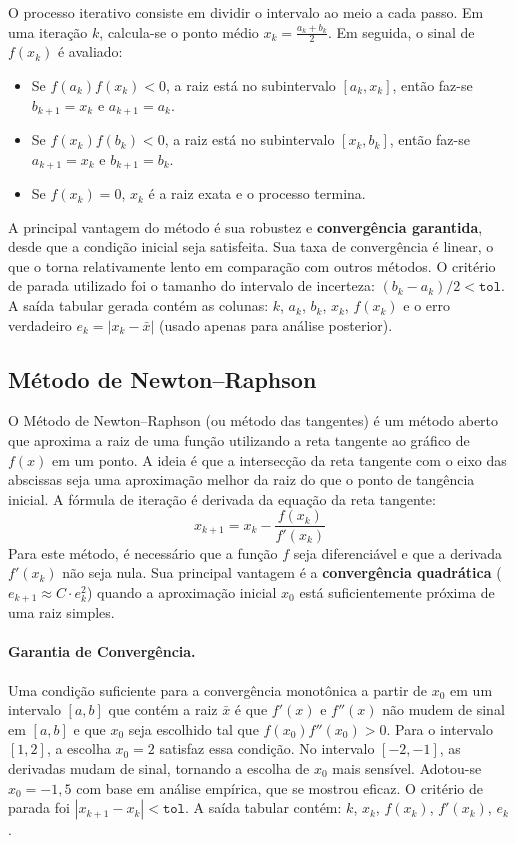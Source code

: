\documentclass[12pt,a4paper]{article}
\begin{document}
O processo iterativo consiste em dividir o intervalo ao meio a cada passo. Em uma iteração $k$, calcula-se o ponto médio $x_k = \frac{a_k+b_k}{2}$. Em seguida, o sinal de $f(x_k)$ é avaliado:
\begin{itemize}
    \item Se $f(a_k)f(x_k) < 0$, a raiz está no subintervalo $[a_k, x_k]$, então faz-se $b_{k+1}=x_k$ e $a_{k+1}=a_k$.
    \item Se $f(x_k)f(b_k) < 0$, a raiz está no subintervalo $[x_k, b_k]$, então faz-se $a_{k+1}=x_k$ e $b_{k+1}=b_k$.
    \item Se $f(x_k) = 0$, $x_k$ é a raiz exata e o processo termina.
\end{itemize}
A principal vantagem do método é sua robustez e \textbf{convergência garantida}, desde que a condição inicial seja satisfeita. Sua taxa de convergência é linear, o que o torna relativamente lento em comparação com outros métodos. O critério de parada utilizado foi o tamanho do intervalo de incerteza: $(b_k-a_k)/2 < \texttt{tol}$. A saída tabular gerada contém as colunas: $k$, $a_k$, $b_k$, $x_k$, $f(x_k)$ e o erro verdadeiro $e_k=|x_k-\bar{x}|$ (usado apenas para análise posterior).

\subsection{Método de Newton--Raphson}
O Método de Newton--Raphson (ou método das tangentes) é um método aberto que aproxima a raiz de uma função utilizando a reta tangente ao gráfico de $f(x)$ em um ponto. A ideia é que a intersecção da reta tangente com o eixo das abscissas seja uma aproximação melhor da raiz do que o ponto de tangência inicial. A fórmula de iteração é derivada da equação da reta tangente:
\[
x_{k+1} = x_k - \frac{f(x_k)}{f'(x_k)}
\]
Para este método, é necessário que a função $f$ seja diferenciável e que a derivada $f'(x_k)$ não seja nula. Sua principal vantagem é a \textbf{convergência quadrática} ($e_{k+1} \approx C \cdot e_k^2$) quando a aproximação inicial $x_0$ está suficientemente próxima de uma raiz simples.

\paragraph{Garantia de Convergência.} Uma condição suficiente para a convergência monotônica a partir de $x_0$ em um intervalo $[a,b]$ que contém a raiz $\bar{x}$ é que $f'(x)$ e $f''(x)$ não mudem de sinal em $[a,b]$ e que $x_0$ seja escolhido tal que $f(x_0)f''(x_0) > 0$. Para o intervalo $[1,2]$, a escolha $x_0=2$ satisfaz essa condição. No intervalo $[-2, -1]$, as derivadas mudam de sinal, tornando a escolha de $x_0$ mais sensível. Adotou-se $x_0 = -1,5$ com base em análise empírica, que se mostrou eficaz. O critério de parada foi $|x_{k+1}-x_k| < \texttt{tol}$. A saída tabular contém: $k$, $x_k$, $f(x_k)$, $f'(x_k)$, $e_k$.
\end{document}
